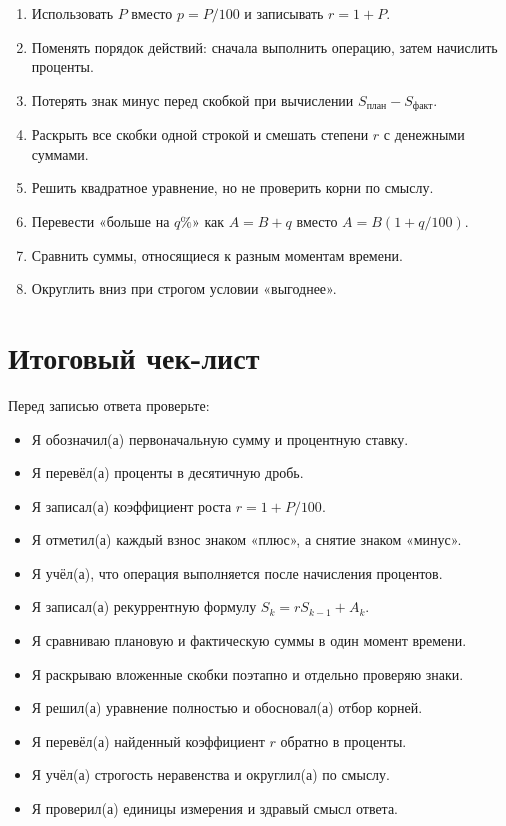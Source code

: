 \documentclass[a4paper,12pt]{article}
\newcommand{\checkitem}{\item[$\square$]}
\begin{document}
\begin{enumerate}
  \item Использовать $P$ вместо $p=P/100$ и записывать $r=1+P$.
  \item Поменять порядок действий: сначала выполнить операцию, затем начислить проценты.
  \item Потерять знак минус перед скобкой при вычислении
  $S_{\text{план}}-S_{\text{факт}}$.
  \item Раскрыть все скобки одной строкой и смешать степени $r$ с денежными суммами.
  \item Решить квадратное уравнение, но не проверить корни по смыслу.
  \item Перевести «больше на $q\%$» как $A=B+q$ вместо
  $A=B(1+q/100)$.
  \item Сравнить суммы, относящиеся к разным моментам времени.
  \item Округлить вниз при строгом условии «выгоднее».
\end{enumerate}

\clearpage
\section{Итоговый чек-лист}

Перед записью ответа проверьте:

\begin{itemize}
  \checkitem Я обозначил(а) первоначальную сумму и процентную ставку.
  \checkitem Я перевёл(а) проценты в десятичную дробь.
  \checkitem Я записал(а) коэффициент роста $r=1+P/100$.
  \checkitem Я отметил(а) каждый взнос знаком «плюс», а снятие знаком «минус».
  \checkitem Я учёл(а), что операция выполняется после начисления процентов.
  \checkitem Я записал(а) рекуррентную формулу $S_k=rS_{k-1}+A_k$.
  \checkitem Я сравниваю плановую и фактическую суммы в один момент времени.
  \checkitem Я раскрываю вложенные скобки поэтапно и отдельно проверяю знаки.
  \checkitem Я решил(а) уравнение полностью и обосновал(а) отбор корней.
  \checkitem Я перевёл(а) найденный коэффициент $r$ обратно в проценты.
  \checkitem Я учёл(а) строгость неравенства и округлил(а) по смыслу.
  \checkitem Я проверил(а) единицы измерения и здравый смысл ответа.
\end{itemize}

\clearpage
\end{document}
